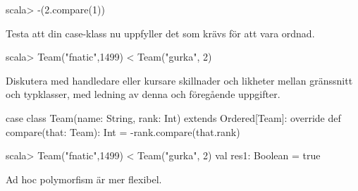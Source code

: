 \begin{REPLnonum}
scala> -(2.compare(1))
\end{REPLnonum}

\Subtask Testa att  din case-klass nu uppfyller det som krävs för att vara ordnad.
\begin{REPLnonum}
scala> Team("fnatic",1499) < Team("gurka", 2)
\end{REPLnonum}


\Subtask Diskutera med handledare eller kursare skillnader och likheter mellan gränssnitt och typklasser, med ledning av denna och föregående uppgifter.
\SOLUTION


\TaskSolved \what

\SubtaskSolved

\begin{Code}
case class  Team(name: String, rank: Int) extends Ordered[Team]:
  override def compare(that: Team): Int = -rank.compare(that.rank)
\end{Code}

\SubtaskSolved

\begin{REPLnonum}
scala> Team("fnatic",1499) < Team("gurka", 2)
val res1: Boolean = true
\end{REPLnonum}

\SubtaskSolved Ad hoc polymorfism är mer flexibel. 

\QUESTEND








